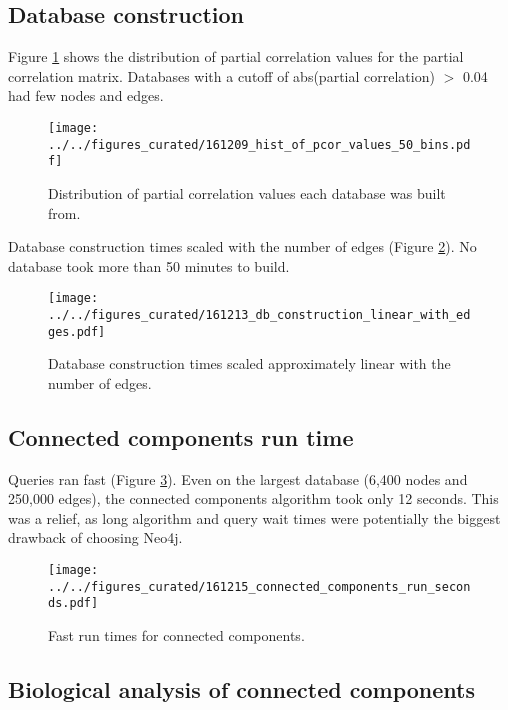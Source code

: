 \documentclass[12pt]{article}
\begin{document}
\subsection{Database construction}

Figure \ref{fig:pcor_hist}  shows the distribution of partial correlation values for the partial correlation matrix.  
Databases with a cutoff of abs(partial correlation) $>$ 0.04 had few nodes and edges. 

\begin{figure}[H]
    \captionsetup{width=0.6\textwidth}
    \centering
    \texttt{[image: ../../figures\_curated/161209\_hist\_of\_pcor\_values\_50\_bins.pdf]}
    \caption{Distribution of partial correlation values each database was built from.}
    \label{fig:pcor_hist}
\end{figure}

Database construction times scaled with the number of edges (Figure \ref{fig:build_times}).  
No database took more than 50 minutes to build.

\begin{figure}[H]
    \captionsetup{width=0.6\textwidth}
    \centering
    \texttt{[image: ../../figures\_curated/161213\_db\_construction\_linear\_with\_edges.pdf]}
    \caption{Database construction times scaled approximately linear with the number of edges.}
    \label{fig:build_times}
\end{figure}

\subsection{Connected components run time}

Queries ran fast (Figure \ref{fig:cc_times}). 
Even on the largest database (6,400 nodes and 250,000 edges), the connected components algorithm took only 12 seconds. 
This was a relief, as long algorithm and query wait times were potentially the biggest drawback of choosing Neo4j.

\begin{figure}[H]
    \captionsetup{width=0.6\textwidth}
    \centering
    \texttt{[image: ../../figures\_curated/161215\_connected\_components\_run\_seconds.pdf]}
    \caption{Fast run times for connected components.}
    \label{fig:cc_times}
\end{figure}


\subsection{Biological analysis of connected components}
\end{document}
